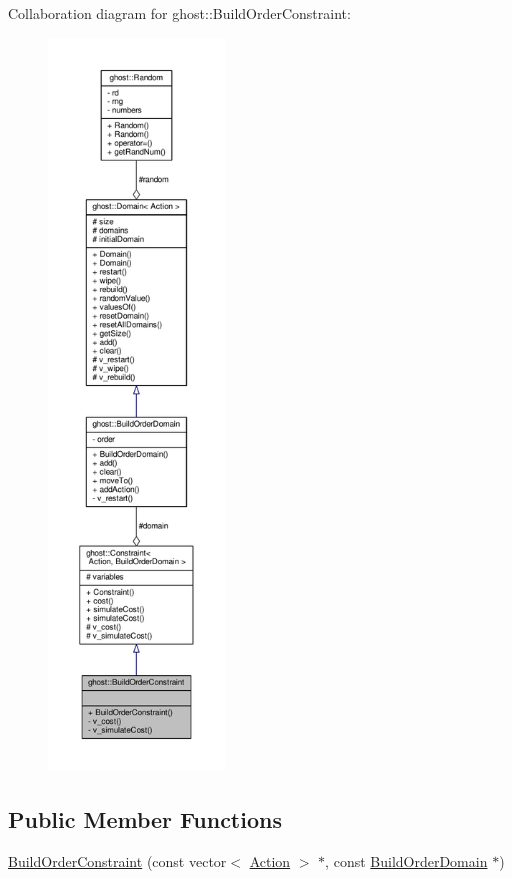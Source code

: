 Collaboration diagram for ghost\-:\-:Build\-Order\-Constraint\-:\nopagebreak
\begin{figure}[H]
\begin{center}
\leavevmode
\includegraphics[height=550pt]{classghost_1_1BuildOrderConstraint__coll__graph}
\end{center}
\end{figure}
\subsection*{Public Member Functions}
\begin{DoxyCompactItemize}
\item 
\hyperlink{classghost_1_1BuildOrderConstraint_af68622d82e3760efc0b2b2cc37fccabe}{Build\-Order\-Constraint} (const vector$<$ \hyperlink{classghost_1_1Action}{Action} $>$ $\ast$, const \hyperlink{classghost_1_1BuildOrderDomain}{Build\-Order\-Domain} $\ast$)
\end{DoxyCompactItemize}
